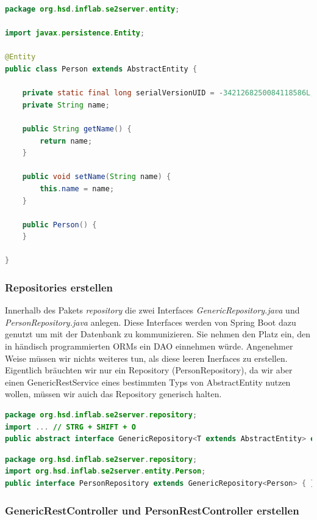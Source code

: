 \documentclass[11pt]{scrartcl}
\begin{document}
\newpage
\begin{lstlisting}[language=java]
package org.hsd.inflab.se2server.entity;

import javax.persistence.Entity;

@Entity
public class Person extends AbstractEntity {
    
    private static final long serialVersionUID = -3421268250084118586L;
    private String name;

    public String getName() {
        return name;
    }

    public void setName(String name) {
        this.name = name;
    }

    public Person() {
    }
    
}
\end{lstlisting}

\subsubsection{Repositories erstellen}
\label{sec:createrepository}

Innerhalb des Pakets \textit{repository} die zwei Interfaces \textit{GenericRepository.java} und 
\textit{PersonRepository.java} anlegen. Diese Interfaces werden von Spring Boot dazu genutzt um mit der Datenbank
zu kommunizieren. Sie nehmen den Platz ein, den in händisch programmierten ORMs ein DAO einnehmen würde.
Angenehmer Weise müssen wir nichts weiteres tun, als diese leeren Inerfaces zu erstellen.
Eigentlich bräuchten wir nur ein Repository (PersonRepository), da wir aber einen GenericRestService 
eines bestimmten Typs von AbstractEntity nutzen wollen, müssen wir auich das Repository generisch halten.
\begin{lstlisting}[language=java]
package org.hsd.inflab.se2server.repository;
import ... // STRG + SHIFT + O
public abstract interface GenericRepository<T extends AbstractEntity> extends JpaRepository<T, Serializable> { }
\end{lstlisting}

\begin{lstlisting}[language=java]
package org.hsd.inflab.se2server.repository;
import org.hsd.inflab.se2server.entity.Person;
public interface PersonRepository extends GenericRepository<Person> { }    
\end{lstlisting}


\newpage
\subsubsection{GenericRestController und PersonRestController erstellen}
\label{sec:createcontroller}
\end{document}
